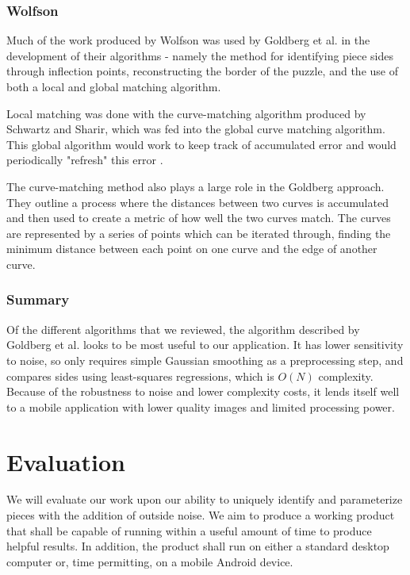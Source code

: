 \documentclass[12pt]{report}
\begin{document}
\subsubsection*{Wolfson}
Much of the work produced by Wolfson was used by Goldberg et al. in the development of their algorithms - namely the method for identifying piece sides through inflection points, reconstructing the border of the puzzle, and the use of both a local and global matching algorithm. 

Local matching was done with the curve-matching algorithm produced by Schwartz and Sharir, which was fed into the global curve matching algorithm. This global algorithm would work to keep track of accumulated error and would periodically "refresh" this error \cite{wolfson}.

The \citeauthor{schwartz} curve-matching method \cite{schwartz} also plays a large role in the Goldberg approach. They outline a process where the distances between two curves is accumulated and then used to create a metric of how well the two curves match. The curves are represented by a series of points which can be iterated through, finding the minimum distance between each point on one curve and the edge of another curve.


\subsubsection*{Summary}
Of the different algorithms that we reviewed, the algorithm described by Goldberg et al. looks to be most useful to our application. It has lower sensitivity to noise, so only requires simple Gaussian smoothing as a preprocessing step, and compares sides using least-squares regressions, which is $O(N)$ complexity. Because of the robustness to noise and lower complexity costs, it lends itself well to a mobile application with lower quality images and limited processing power.


\section*{Evaluation}
We will evaluate our work upon our ability to uniquely identify and parameterize pieces with the addition of outside noise. We aim to produce a working product that shall be capable of running within a useful amount of time to produce helpful results. In addition, the product shall run on either a standard desktop computer or, time permitting, on a mobile Android device.
\end{document}
